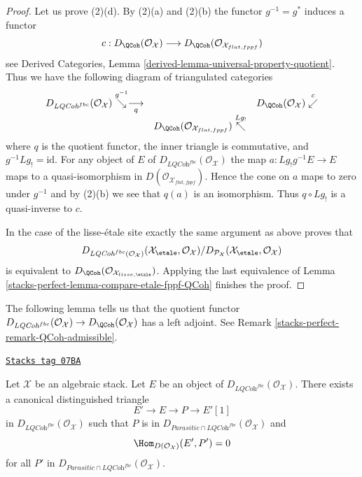 \begin{proof}
\medskip\noindent
Let us prove (2)(d). By (2)(a) and (2)(b) the functor $g^{-1} = g^*$ induces
a functor
$$
c :
D_\QCoh(\mathcal{O}_\mathcal{X})
\longrightarrow
D_\QCoh(\mathcal{O}_{\mathcal{X}_{flat, fppf}})
$$
see
Derived Categories, Lemma \ref{derived-lemma-universal-property-quotient}.
Thus we have the following diagram of triangulated categories
$$
\begin{array}{ccc}D_{\textit{LQCoh}^{fbc}}(\mathcal{O}_\mathcal{X})
\overset{g^{-1}}{\searrow}\underset{q}{\longrightarrow} &  & D_\QCoh(\mathcal{O}_\mathcal{X}) \overset{c}{\swarrow} \\  & D_\QCoh(\mathcal{O}_{\mathcal{X}_{flat, fppf}})
\overset{Lg_!}{\nwarrow} & \end{array}
$$
where $q$ is the quotient functor, the inner triangle is commutative, and
$g^{-1}Lg_! = \text{id}$.
For any object of $E$ of $D_{\textit{LQCoh}^{fbc}}(\mathcal{O}_\mathcal{X})$
the map $a : Lg_!g^{-1}E \to E$ maps to a quasi-isomorphism in
$D(\mathcal{O}_{\mathcal{X}_{flat, fppf}})$. Hence the cone on
$a$ maps to zero under $g^{-1}$ and by (2)(b) we see that $q(a)$ is
an isomorphism. Thus $q \circ Lg_!$ is a quasi-inverse to $c$.

\medskip\noindent
In the case of the lisse-\'etale site exactly the same argument as above
proves that
$$
D_{\textit{LQCoh}^{fbc}(\mathcal{O}_\mathcal{X})}(
\mathcal{X}_\etale, \mathcal{O}_\mathcal{X})
/
D_{\mathcal{P}_\mathcal{X}}(
\mathcal{X}_\etale, \mathcal{O}_\mathcal{X})
$$
is equivalent to
$D_\QCoh(\mathcal{O}_{\mathcal{X}_{lisse,\etale}})$.
Applying the last equivalence of
Lemma \ref{stacks-perfect-lemma-compare-etale-fppf-QCoh}
finishes the proof.
\end{proof}

The following lemma tells us that the quotient functor
$D_{\textit{LQCoh}^{fbc}}(\mathcal{O}_\mathcal{X}) \to
D_\QCoh(\mathcal{O}_\mathcal{X})$ has a left adjoint.
See Remark \ref{stacks-perfect-remark-QCoh-admissible}.

\begin{lemma}
\label{stacks-perfect-lemma-bousfield-colocalization}
\href{https://stacks.math.columbia.edu/tag/07BA}{\texttt{Stacks tag 07BA}}

Let $\mathcal{X}$ be an algebraic stack.
Let $E$ be an object of $D_{\textit{LQCoh}^{fbc}}(\mathcal{O}_\mathcal{X})$.
There exists a canonical distinguished triangle
$$
E' \to E \to P \to E'[1]
$$
in $D_{\textit{LQCoh}^{fbc}}(\mathcal{O}_\mathcal{X})$ such that
$P$ is in $D_{\textit{Parasitic} \cap \textit{LQCoh}^{fbc}}
(\mathcal{O}_\mathcal{X})$
and
$$
\Hom_{D(\mathcal{O}_\mathcal{X})}(E', P') = 0
$$
for all $P'$ in
$D_{\textit{Parasitic} \cap \textit{LQCoh}^{fbc}}(\mathcal{O}_\mathcal{X})$.
\end{lemma}

